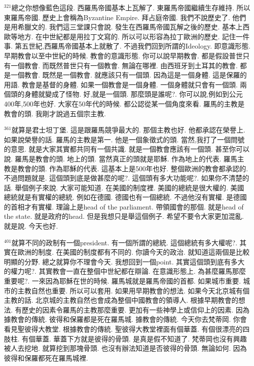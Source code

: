 \documentclass{book}
\begin{document}
$^{321}$總之你想像藍色這段.
西羅馬帝國基本上瓦解了.
東羅馬帝國繼續生存維持.
所以東羅馬帝國.
歷史上會稱為Byzantine Empire.
拜占庭帝國.
我們不說歷史了.
他們是用希臘文的.
我們這三堂課只會說.
發生在西羅馬帝國瓦解之後的歷史.
基本上西歐等地方.
在中世紀都是用拉丁文寫的.
所以可以形容為拉丁歐洲的歷史.
記住一件事.
第五世紀,西羅馬帝國基本上就散了.
不過我們回到所謂的Ideology.
即意識形態.
早期教會以至中世紀的時候.
教會的意識形態.
你可以說早期教會.
都是假設普世只有一個教會.
而既然普世只有一個教會.
無論在哪裡.
由西班牙到土耳其的教會.
都是一個教會.
既然是一個教會.
就應該只有一個頭.
因為這是一個身體.
這是保羅的用語.
教會是基督的身體.
如果一個教會是一個身體.
一個身體就只會有一個頭.
兩個頭的身體就變成了怪物.
好,就是一個頭.
那麼頭是誰呢?.
你可以說,例如到公元400年,500年也好.
大家在50年代的時候.
都公認從某一個角度來看.
羅馬的主教是教會的頭.
我剛才說過五個宗主教.

$^{361}$就算是君士坦丁堡.
這是跟羅馬競爭最大的.
那個主教也好.
他都承認在榮譽上.
如果說榮譽的話.
羅馬的主教是第一.
他是一個象徵式的頭.
當然,我打了一個問號的意思.
就是大家其實都共同有一個共識.
就是一個教會應該有一個頭.
甚至你可以說.
羅馬是教會的頭.
地上的頭.
當然真正的頭就是耶穌.
作為地上的代表.
羅馬主教是教會的頭.
作為耶穌的代表.
這基本上是500年也好.
整個歐洲的教會都承認的.
不過問題就是.
這個頭到底是做甚麼的呢?.
這個頭有多大功能呢?.
如果你不清楚的話.
舉個例子來說.
大家可能知道.
在美國的制度裡.
美國的總統是很大權的.
美國總統就是有實權的總統.
例如在德國.
德國也有一個總統.
不過他沒有實權.
是德國的首相才有實權.
理論上是head of the parliament.
帶領國會的那個.
就是head of the state.
就是政府的head.
但是我想只是舉這個例子.
希望不要令大家更加混亂.
就是說.
今天也好.

$^{401}$就算不同的政制有一個president.
有一個所謂的總統.
這個總統有多大權呢?.
其實在歐洲的制度.
在美國的制度都有不同的.
你讀今天的政治.
就知道這兩個是比較明顯的分野.
總之就算你不理會今天.
我想回到一個point.
其實這個頭到底有多大的權力呢?.
其實教會一直在整個中世紀都在辯論.
在意識形態上.
為甚麼羅馬那麼重要呢?.
一來因為耶穌在世的時候.
羅馬城就是羅馬帝國的首都.
如果城市重要.
城市的主教自然也重要.
所以可以套用.
如果用早期教會的想法.
如果今天北京城有個主教的話.
北京城的主教自然也會成為整個中國教會的領導人.
根據早期教會的想法.
有歷史的因素令羅馬的主教那麼重要.
更加有一些神學上或信仰上的因素.
因為據教會的傳統.
彼得和保羅都是死在羅馬城.
據教會的傳統.
今天你去梵蒂岡.
你會看見聖彼得大教堂.
根據教會的傳統.
聖彼得大教堂裡面有個華蓋.
有個很漂亮的四肢柱.
有個華蓋.
華蓋下方就是彼得的骨頭.
是真是假不知道了.
梵蒂岡也沒有興趣被人去挖地.
就算挖到那塊骨頭.
也沒有辦法知道是否彼得的骨頭.
無論如何.
因為彼得和保羅都死在羅馬城裡.
\end{document}

